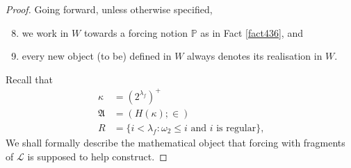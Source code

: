 \documentclass[12pt, twoside]{memoir}
\numberwithin{equation}{section}
\theoremstyle{definition}
\theoremstyle{remark}
\theoremstyle{definition}
\theoremstyle{definition}
\theoremstyle{definition}
\theoremstyle{remark}
\begin{document}
\begin{proof}
Going forward, unless otherwise specified, 
\begin{enumerate}[label=(\Alph*)]
    \setcounter{enumi}{7}
    \item we work in $W$ towards a forcing notion $\mathbb{P}$ as in Fact \ref{fact436}, and
    \item every new object (to be) defined in $W$ always denotes its realisation in $W$. 
\end{enumerate}
Recall that
\begin{align*}
    \kappa & = (2^{\lambda_f})^+ \\
    \mathfrak{A} & = (H(\kappa); \in) \\
    R & = \{i < \lambda_f : \omega_2 \leq i \text{ and } i \text{ is regular}\} \text{,}
\end{align*}
We shall formally describe the mathematical object that forcing with fragments of $\mathcal{L}$ is supposed to help construct. 


\end{proof}
\end{document}
